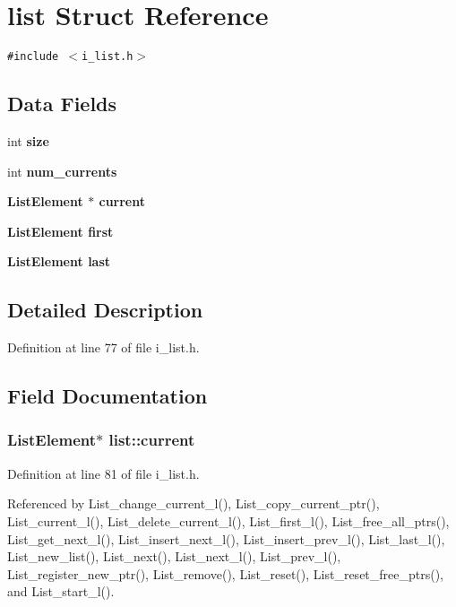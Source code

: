 \section{list Struct Reference}
\label{structlist}
{\tt \#include $<$i\_\-list.h$>$}

\subsection*{Data Fields}
\begin{CompactItemize}
\item 
int \bf{size}
\item 
int \bf{num\_\-currents}
\item 
\bf{List\-Element} $\ast$ \bf{current}
\item 
\bf{List\-Element} \bf{first}
\item 
\bf{List\-Element} \bf{last}
\end{CompactItemize}


\subsection{Detailed Description}




Definition at line 77 of file i\_\-list.h.

\subsection{Field Documentation}
\subsubsection{\setlength{\rightskip}{0pt plus 5cm}\bf{List\-Element}$\ast$ \bf{list::current}}\label{structlist_5f2eed8d499e5ca35f6cd20d8cc522d1}




Definition at line 81 of file i\_\-list.h.

Referenced by List\_\-change\_\-current\_\-l(), List\_\-copy\_\-current\_\-ptr(), List\_\-current\_\-l(), List\_\-delete\_\-current\_\-l(), List\_\-first\_\-l(), List\_\-free\_\-all\_\-ptrs(), List\_\-get\_\-next\_\-l(), List\_\-insert\_\-next\_\-l(), List\_\-insert\_\-prev\_\-l(), List\_\-last\_\-l(), List\_\-new\_\-list(), List\_\-next(), List\_\-next\_\-l(), List\_\-prev\_\-l(), List\_\-register\_\-new\_\-ptr(), List\_\-remove(), List\_\-reset(), List\_\-reset\_\-free\_\-ptrs(), and List\_\-start\_\-l().
